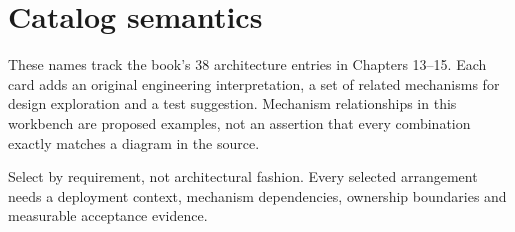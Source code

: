 \documentclass[10pt,letterpaper]{article}
\begin{document}
\sourceStatement
\tableofcontents
\newpage
\section{Catalog semantics}
These names track the book's 38 architecture entries in Chapters 13--15. Each card adds an original engineering interpretation, a set of related mechanisms for design exploration and a test suggestion. Mechanism relationships in this workbench are proposed examples, not an assertion that every combination exactly matches a diagram in the source.
\begin{takeaway}
Select by requirement, not architectural fashion. Every selected arrangement needs a deployment context, mechanism dependencies, ownership boundaries and measurable acceptance evidence.
\end{takeaway}
\end{document}
